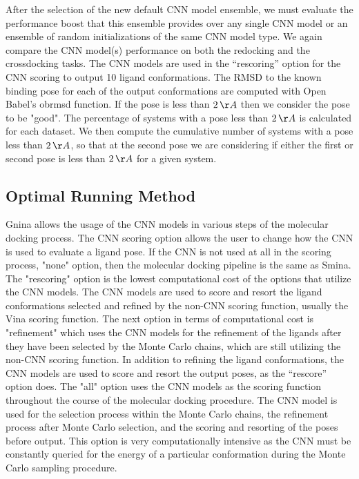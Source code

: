 \documentclass[journal=jcisd8,manuscript=article]{achemso}
\begin{document}
After the selection of the new default CNN model ensemble, we must evaluate the performance boost that this ensemble provides over any single CNN model or an ensemble of random initializations of the same CNN model type. We again compare the CNN model(s) performance on both the redocking and the crossdocking tasks. The CNN models are used in the ``rescoring'' option for the CNN scoring to output 10 ligand conformations. The RMSD to the known binding pose for each of the output conformations are computed with Open Babel's obrmsd function. If the pose is less than $2\,\AA$ then we consider the pose to be "good". The percentage of systems with a pose less than $2\,\AA$ is calculated for each dataset. We then compute the cumulative number of systems with a pose less than $2\,\AA$, so that at the second pose we are considering if either the first or second pose is less than $2\,\AA$ for a given system.

\subsection{Optimal Running Method}
Gnina allows the usage of the CNN models in various steps of the molecular docking process. The CNN scoring option allows the user to change how the CNN is used to evaluate a ligand pose. If the CNN is not used at all in the scoring process, "none" option, then the molecular docking pipeline is the same as Smina. The "rescoring" option is the lowest computational cost of the options that utilize the CNN models. The CNN models are used to score and resort the ligand conformations selected and refined by the non-CNN scoring function, usually the Vina scoring function. The next option in terms of computational cost is "refinement" which uses the CNN models for the refinement of the ligands after they have been selected by the Monte Carlo chains, which are still utilizing the non-CNN scoring function. In addition to refining the ligand conformations, the CNN models are used to score and resort the output poses, as the ``rescore'' option does. The "all" option uses the CNN models as the scoring function throughout the course of the molecular docking procedure. The CNN model is used for the selection process within the Monte Carlo chains, the refinement process after Monte Carlo selection, and the scoring and resorting of the poses before output. This option is very computationally intensive as the CNN must be constantly queried for the energy of a particular conformation during the Monte Carlo sampling procedure.
\end{document}
